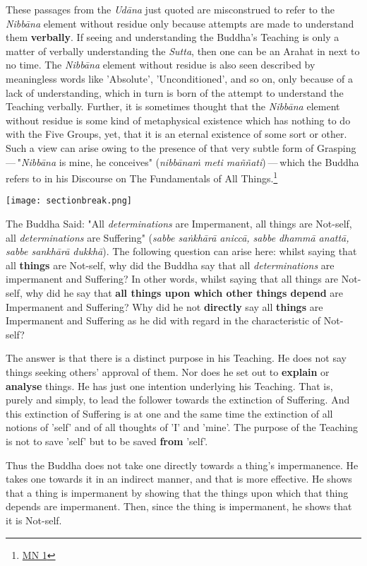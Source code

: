 These passages from the \emph{Udāna} just quoted are misconstrued to refer to the \emph{Nibbāna} element without residue only because attempts are made to understand them \textbf{verbally}. If seeing and understanding the Buddha's Teaching is only a matter of verbally understanding the \emph{Sutta}, then one can be an Arahat in next to no time. The \emph{Nibbāna} element without residue is also seen described by meaningless words like 'Absolute', 'Unconditioned', and so on, only because of a lack of understanding, which in turn is born of the attempt to understand the Teaching verbally. Further, it is sometimes thought that the \emph{Nibbāna} element without residue is some kind of metaphysical existence which has nothing to do with the Five Groups, yet, that it is an eternal existence of some sort or other. Such a view can arise owing to the presence of that very subtle form of Grasping --- "\emph{Nibbāna} is mine, he conceives" (\emph{nibbānaṁ meti maññati}) --- which the Buddha refers to in his Discourse on The Fundamentals of All Things.\footnote{\href{https://suttacentral.net/mn1/en/bodhi}{MN 1}}

\texttt{[image: sectionbreak.png]}

The Buddha Said: "All \emph{determinations} are Impermanent, all things are Not-self, all \emph{determinations} are Suffering" (\emph{sabbe saṅkhārā aniccā, sabbe dhammā anattā, sabbe sankhārā dukkhā}). The following question can arise here: whilst saying that all \textbf{things} are Not-self, why did the Buddha say that all \emph{determinations} are impermanent and Suffering? In other words, whilst saying that all things are Not-self, why did he say that \textbf{all things upon which other things depend} are Impermanent and Suffering? Why did he not \textbf{directly} say all \textbf{things} are Impermanent and Suffering as he did with regard in the characteristic of Not-self?

The answer is that there is a distinct purpose in his Teaching. He does not say things seeking others' approval of them. Nor does he set out to \textbf{explain} or \textbf{analyse} things. He has just one intention underlying his Teaching. That is, purely and simply, to lead the follower towards the extinction of Suffering. And this extinction of Suffering is at one and the same time the extinction of all notions of 'self' and of all thoughts of 'I' and 'mine'. The purpose of the Teaching is not to save 'self' but to be saved \textbf{from} 'self'.

Thus the Buddha does not take one directly towards a thing's impermanence. He takes one towards it in an indirect manner, and that is more effective. He shows that a thing is impermanent by showing that the things upon which that thing depends are impermanent. Then, since the thing is impermanent, he shows that it is Not-self.

